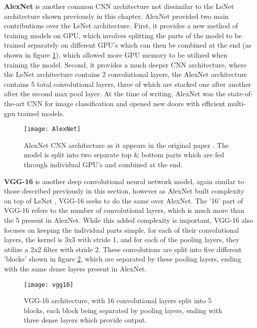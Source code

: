 \textbf{AlexNet} \cite{alexnet} is another common CNN architecture not dissimilar to the LeNet architecture \cite{lenet5} shown previously in this chapter. AlexNet provided two main contributions over the LeNet architecture. First, it provides a new method of training models on GPU, which involves splitting the parts of the model to be trained separately on different GPU's which can then be combined at the end (as shown in figure \ref{fig:alexnet}), which allowed more GPU memory to be utilized when training the model. Second, it provides a much deeper CNN architecture, where the LeNet architecture contains 2 convolutional layers, the AlexNet architecture contains 5 total convolutional layers, three of which are stacked one after another after the second max pool layer. At the time of writing, AlexNet was the state-of-the-art CNN for image classification and opened new doors with efficient multi-gpu trained models.

\begin{figure}[ht]
	\texttt{[image: AlexNet]}
	\centering
	\caption{AlexNet \cite{alexnet} CNN architecture as it appears in the original paper \cite{alexnet}. The model is split into two separate top \& bottom parts which are fed through individual GPU's and combined at the end.}
	\label{fig:alexnet}
\end{figure}

\textbf{VGG-16} \cite{vgg16} is another deep convolutional neural network model, again similar to those described previously in this section, however as AlexNet \cite{alexnet} built complexity on top of LeNet \cite{lenet5}, VGG-16 seeks to do the same over AlexNet. The '16' part of VGG-16 refers to the number of convolutional layers, which is much more than the 5 present in AlexNet. While this added complexity is important, VGG-16 also focuses on keeping the individual parts simple, for each of their convolutional layers, the kernel is 3x3 with stride 1, and for each of the pooling layers, they utilize a 2x2 filter with stride 2. These convolutions are split into five different 'blocks' shown in figure \ref{fig:vgg16}, which are separated by these pooling layers, ending with the same dense layers present in AlexNet.

\begin{figure}[ht]
	\texttt{[image: vgg16]}
	\centering
	\caption{VGG-16 \cite{vgg16} architecture, with 16 convolutional layers split into 5 blocks, each block being separated by pooling layers, ending with three dense layers which provide output.}
	\label{fig:vgg16}
\end{figure}

